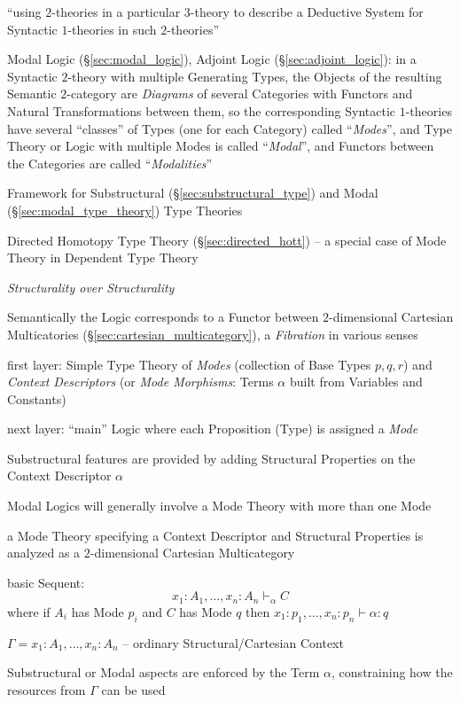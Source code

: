 ``using $2$-theories in a particular $3$-theory to describe a Deductive System
for Syntactic $1$-theories in such $2$-theories''

Modal Logic (\S\ref{sec:modal_logic}), Adjoint Logic
(\S\ref{sec:adjoint_logic}): in a Syntactic $2$-theory with multiple Generating
Types, the Objects of the resulting Semantic $2$-category are \emph{Diagrams}
of several Categories with Functors and Natural Transformations between them,
so the corresponding Syntactic $1$-theories have several ``classes'' of Types
(one for each Category) called ``\emph{Modes}'', and Type Theory or Logic
with multiple Modes is called ``\emph{Modal}'', and Functors between the
Categories are called ``\emph{Modalities}''

Framework for Substructural (\S\ref{sec:substructural_type}) and Modal
(\S\ref{sec:modal_type_theory}) Type Theories

\fist Directed Homotopy Type Theory (\S\ref{sec:directed_hott}) --
a special case of Mode Theory in Dependent Type Theory

\emph{Structurality over Structurality}

Semantically the Logic corresponds to a Functor between
$2$-dimensional Cartesian Multicatories
(\S\ref{sec:cartesian_multicategory}), a \emph{Fibration} in various
senses

first layer: Simple Type Theory of \emph{Modes} (collection of Base
Types $p,q,r$) and \emph{Context Descriptors} (or \emph{Mode
  Morphisms}: Terms $\alpha$ built from Variables and Constants)

next layer: ``main'' Logic where each Proposition (Type) is assigned a
\emph{Mode}

Substructural features are provided by adding Structural Properties on
the Context Descriptor $\alpha$

Modal Logics will generally involve a Mode Theory with more than one
Mode

a Mode Theory specifying a Context Descriptor and Structural
Properties is analyzed as a $2$-dimensional Cartesian Multicategory

basic Sequent:
\[
  x_1:A_1,\ldots,x_n:A_n \vdash_\alpha C
\]
where if $A_i$ has Mode $p_i$ and $C$ has Mode $q$ then
$x_1:p_1,\ldots,x_n:p_n \vdash \alpha:q$

$\Gamma = x_1:A_1,\ldots,x_n:A_n$ -- ordinary Structural/Cartesian
Context

Substructural or Modal aspects are enforced by the Term $\alpha$,
constraining how the resources from $\Gamma$ can be used

